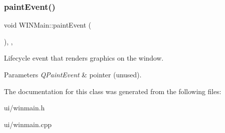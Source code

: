 \subsubsection{\texorpdfstring{paintEvent()}{paintEvent()}}
{\footnotesize\ttfamily void W\+I\+N\+Main\+::paint\+Event (\begin{DoxyParamCaption}\item[{Q\+Paint\+Event $\ast$}]{ }\end{DoxyParamCaption})\hspace{0.3cm}{\ttfamily [override]}, {\ttfamily [protected]}, {\ttfamily [virtual]}}



Lifecycle event that renders graphics on the window. 


\begin{DoxyParams}{Parameters}
{\em Q\+Paint\+Event} & pointer (unused). \\
\hline
\end{DoxyParams}


The documentation for this class was generated from the following files\+:\begin{DoxyCompactItemize}
\item 
ui/winmain.\+h\item 
ui/winmain.\+cpp\end{DoxyCompactItemize}
